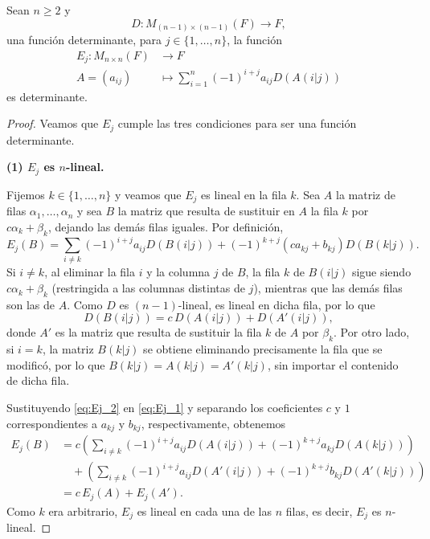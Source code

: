 \documentclass[12pt,a4paper]{book}
\newcommand{\llaves}[1]{\{#1\}}
\newcommand{\parentesis}[1]{\left(#1\right)}
\begin{document}
    \begin{teorema}
        Sean $n \geq 2$ y 
        \[
        D: M_{(n - 1) \times (n - 1)}(F) \longrightarrow F,
        \]
        una función determinante, para $j \in \llaves{1, \dots, n}$, la función
        \begin{align*}
            E_j: M_{n \times n}(F) & \longrightarrow F\\
            A = (a_{ij}) & \longmapsto \sum_{i = 1}^n(-1)^{i + j}a_{ij}D(A(i|j))
        \end{align*}
        es determinante.
    \end{teorema}

    \begin{proof}
        Veamos que $E_j$ cumple las tres condiciones para ser una función determinante.

        \textbf{(1) $E_j$ es $n$-lineal.}

        Fijemos $k \in \llaves{1, \dots, n}$ y veamos que $E_j$ es lineal en la fila $k$. Sea $A$ la matriz de filas $\alpha_1, \dots, \alpha_n$ y sea $B$ la matriz que resulta de sustituir en $A$ la fila $k$ por $c\alpha_k + \beta_k$, dejando las demás filas iguales. Por definición,
        \begin{equation}
            E_j(B) = \sum_{i \neq k} (-1)^{i+j} a_{ij} D(B(i|j)) + (-1)^{k+j}(ca_{kj} + b_{kj}) D(B(k|j)).
            \label{eq:Ej_1}
        \end{equation}
        Si $i \neq k$, al eliminar la fila $i$ y la columna $j$ de $B$, la fila $k$ de $B(i|j)$ sigue siendo $c\alpha_k + \beta_k$ (restringida a las columnas distintas de $j$), mientras que las demás filas son las de $A$. Como $D$ es $(n-1)$-lineal, es lineal en dicha fila, por lo que
        \begin{equation}
            D(B(i|j)) = c \, D(A(i|j)) + D(A'(i|j)),
            \label{eq:Ej_2}
        \end{equation}
        donde $A'$ es la matriz que resulta de sustituir la fila $k$ de $A$ por $\beta_k$. Por otro lado, si $i = k$, la matriz $B(k|j)$ se obtiene eliminando precisamente la fila que se modificó, por lo que $B(k|j) = A(k|j) = A'(k|j)$, sin importar el contenido de dicha fila.

        Sustituyendo \eqref{eq:Ej_2} en \eqref{eq:Ej_1} y separando los coeficientes $c$ y $1$ correspondientes a $a_{kj}$ y $b_{kj}$, respectivamente, obtenemos
        \begin{align*}
            E_j(B) & = c \parentesis{\sum_{i \neq k} (-1)^{i+j} a_{ij} D(A(i|j)) + (-1)^{k+j} a_{kj} D(A(k|j))} \\
            & \quad + \parentesis{\sum_{i \neq k} (-1)^{i+j} a_{ij} D(A'(i|j)) + (-1)^{k+j} b_{kj} D(A'(k|j))} \\
            & = c \, E_j(A) + E_j(A').
        \end{align*}
        Como $k$ era arbitrario, $E_j$ es lineal en cada una de las $n$ filas, es decir, $E_j$ es $n$-lineal.


\end{proof}
\end{document}

